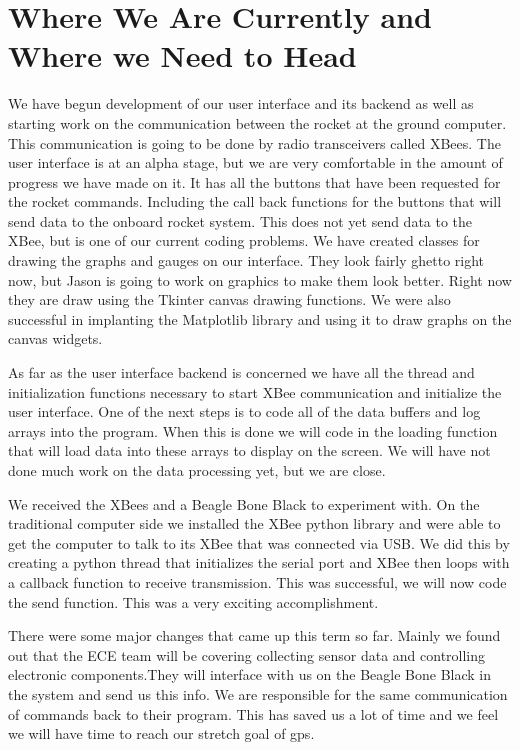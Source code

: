 \documentclass[10pt,draftclsnofoot,onecolumn]{IEEEtran}
\begin{document}
\section{Where We Are Currently and Where we Need to Head}
We have begun development of our user interface and its backend as well as starting work on the communication between the rocket at the ground computer. This communication is going to be done by radio transceivers called XBees. The user interface is at an alpha stage, but we are very comfortable in the amount of progress we have made on it. It has all the buttons that have been requested for the rocket commands. Including the call back functions for the buttons that will send data to the onboard rocket system. This does not yet send data to the XBee, but is one of our current coding problems. We have created classes for drawing the graphs and gauges on our interface. They look fairly ghetto right now, but Jason is going to work on graphics to make them look better. Right now they are draw using the Tkinter canvas drawing functions. We were also successful in implanting the Matplotlib library and using it to draw graphs on the canvas widgets.\par
As far as the user interface backend is concerned we have all the thread and initialization functions necessary to start XBee communication and initialize the user interface. One of the next steps is to code all of the data buffers and log arrays into the program. When this is done we will code in the loading function that will load data into these arrays to display on the screen. We will have not done much work on the data processing yet, but we are close. \par
We received the XBees and a Beagle Bone Black to experiment with. On the traditional computer side we installed the XBee python library and were able to get the computer to talk to its XBee that was connected via USB. We did this by creating a python thread that initializes the serial port and XBee then loops with a callback function to receive transmission. This was successful, we will now code the send function. This was a very exciting accomplishment.\par
There were some major changes that came up this term so far. Mainly we found out that the ECE team will be covering collecting sensor data and controlling electronic components.They will interface with us on the Beagle Bone Black in the system and send us this info. We are responsible for the same communication of commands back to their program. This has saved us a lot of time and we feel we will have time to reach our stretch goal of gps.\par
\end{document}
